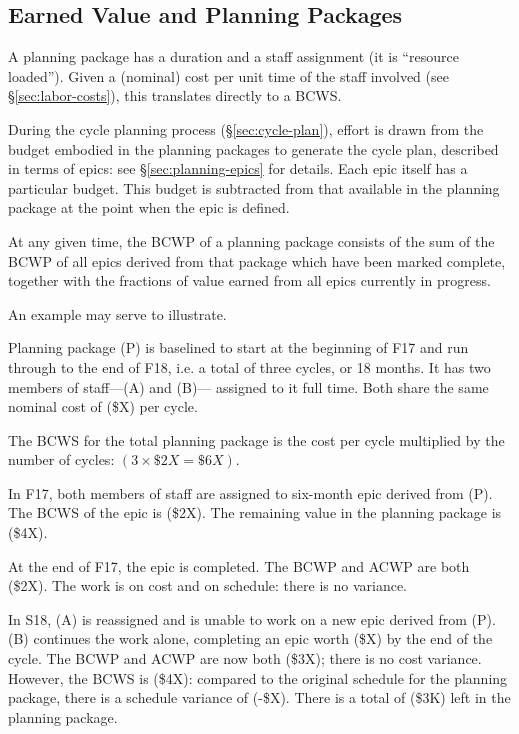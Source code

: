 \subsection{Earned Value and Planning Packages}
\label{sec:long-term-value}

A planning package has a duration and a staff assignment (it is
``resource loaded''). Given a (nominal) cost per unit time of the staff
involved (see \S\ref{sec:labor-costs}), this translates directly to a BCWS.

During the cycle planning process (\S\ref{sec:cycle-plan}), effort is drawn from the budget embodied in the
planning packages to generate the cycle plan, described in terms of
epics: see \S\ref{sec:planning-epics} for details. Each epic itself has a
particular budget. This budget is subtracted from that available in the
planning package at the point when the epic is defined.

At any given time, the BCWP of a planning package consists of the sum of
the BCWP of all epics derived from that package which have been marked
complete, together with the fractions of value earned from all epics
currently in progress.

An example may serve to illustrate.

Planning package (P) is baselined to start at the beginning of F17 and
run through to the end of F18, i.e. a total of three cycles, or 18
months. It has two members of staff---(A) and (B)--- assigned to it
full time. Both share the same nominal cost of (\$X) per cycle.

The BCWS for the total planning package is the cost per cycle multiplied
by the number of cycles: $(3 \times \$2X = \$6X)$.

In F17, both members of staff are assigned to six-month epic derived
from (P). The BCWS of the epic is (\$2X). The remaining value in the
planning package is (\$4X).

At the end of F17, the epic is completed. The BCWP and ACWP are both
(\$2X). The work is on cost and on schedule: there is no variance.

In S18, (A) is reassigned and is unable to work on a new epic derived
from (P). (B) continues the work alone, completing an epic worth
(\$X) by the end of the cycle. The BCWP and ACWP are now both (\$3X);
there is no cost variance. However, the BCWS is (\$4X): compared to the
original schedule for the planning package, there is a schedule variance
of (-\$X). There is a total of (\$3K) left in the planning package.

